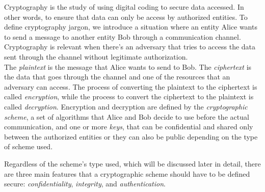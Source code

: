 Cryptography is the study of using digital coding to secure data accessed. In other words, to ensure that data can only be access by authorized entities. To define cryptography jargon, we introduce a situation where an entity Alice wants to send a message to another entity Bob through a communication channel. Cryptography is relevant when there's an adversary that tries to access the data sent through the channel without legitimate authorization.\\
The \emph{plaintext} is the message that Alice wants to send to Bob. The \emph{ciphertext} is the data that goes through the channel and one of the resources that an adversary can access.
The process of converting the plaintext to the ciphertext is called \emph{encryption}, while the process to convert the ciphertext to the plaintext is called \emph{decryption}.
Encryption and decryption are defined by the \emph{cryptographic scheme}, a set of algorithms that Alice and Bob decide to use before the actual communication, and one or more \emph{keys}, that can be confidential and shared only between the authorized entities or they can also be public depending on the type of scheme used.\par
Regardless of the scheme's type used, which will be discussed later in detail, there are three main features that a cryptographic scheme should have to be defined secure: \emph{confidentiality}, \emph{integrity}, and \emph{authentication}.
